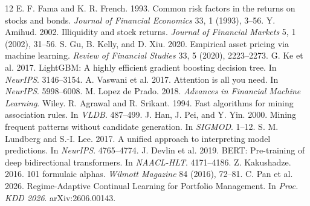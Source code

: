 \documentclass[sigconf]{acmart}
\begin{document}
\begin{thebibliography}{12}
 E. F. Fama and K. R. French. 1993. Common risk factors in the returns on stocks and bonds. \emph{Journal of Financial Economics} 33, 1 (1993), 3--56.
 Y. Amihud. 2002. Illiquidity and stock returns. \emph{Journal of Financial Markets} 5, 1 (2002), 31--56.
 S. Gu, B. Kelly, and D. Xiu. 2020. Empirical asset pricing via machine learning. \emph{Review of Financial Studies} 33, 5 (2020), 2223--2273.
 G. Ke et al. 2017. LightGBM: A highly efficient gradient boosting decision tree. In \emph{NeurIPS}. 3146--3154.
 A. Vaswani et al. 2017. Attention is all you need. In \emph{NeurIPS}. 5998--6008.
 M. Lopez de Prado. 2018. \emph{Advances in Financial Machine Learning}. Wiley.
 R. Agrawal and R. Srikant. 1994. Fast algorithms for mining association rules. In \emph{VLDB}. 487--499.
 J. Han, J. Pei, and Y. Yin. 2000. Mining frequent patterns without candidate generation. In \emph{SIGMOD}. 1--12.
 S. M. Lundberg and S.-I. Lee. 2017. A unified approach to interpreting model predictions. In \emph{NeurIPS}. 4765--4774.
 J. Devlin et al. 2019. BERT: Pre-training of deep bidirectional transformers. In \emph{NAACL-HLT}. 4171--4186.
 Z. Kakushadze. 2016. 101 formulaic alphas. \emph{Wilmott Magazine} 84 (2016), 72--81.
 C. Pan et al. 2026. Regime-Adaptive Continual Learning for Portfolio Management. In \emph{Proc. KDD 2026}. arXiv:2606.00143.
\end{thebibliography}
\end{document}
